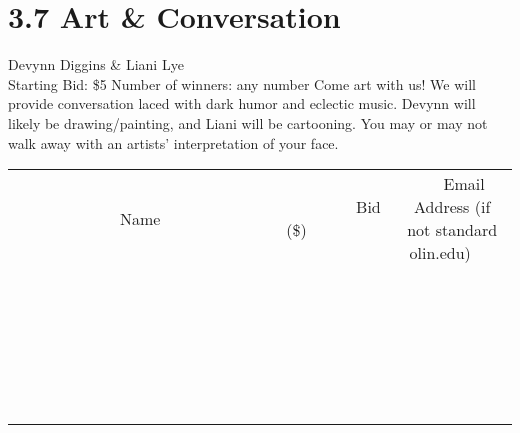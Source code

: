 \documentclass[11pt]{article}
\begin{document}
\section*{3.7 Art \& Conversation}
Devynn Diggins \& Liani Lye
\\
Starting Bid: \$5
\newline
Number of winners: any number
\newline
Come art with us!  We will provide conversation laced with dark humor and eclectic music.  Devynn will likely be drawing/painting, and Liani will be cartooning.   You may or may not walk away with an artists' interpretation of your face.
\\[6ex]
\begin{tabular}{c c c}
~~~~~~~~~~~~~Name~~~~~~~~~~~~~ & ~~~~~~~~~Bid (\$)~~~~~~~~~  & ~~~Email Address (if not standard olin.edu)~~~\\
 & & \\
\hline
 & & \\
\hline
 & & \\
\hline
 & & \\
\hline
 & & \\
\hline
 & & \\
\hline
 & & \\
\hline
 & & \\
\hline
 & & \\
\hline
 & & \\
\hline
 & & \\
\hline
 & & \\
\hline
 & & \\
\hline
 & & \\
\hline
 & & \\
\hline
 & & \\
\hline
 & & \\
\hline
 & & \\
\hline
 & & \\
\hline
 & & \\
\hline
 & & \\
\hline
 & & \\
\hline
 & & \\
\hline
 & & \\
\hline
 & & \\
\hline
 & & \\
\hline
\end{tabular}
\newpage
\end{document}
